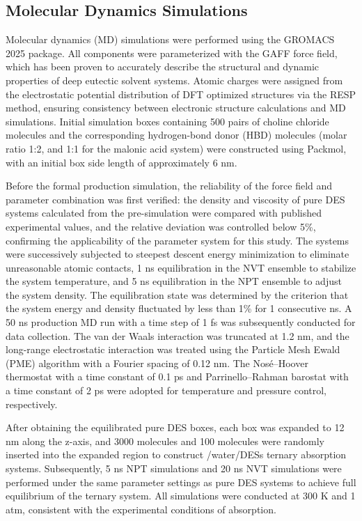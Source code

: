 \documentclass[AMA,LATO2COL]{WileyNJDv5} %
\begin{document}
\subsection{Molecular Dynamics Simulations}
Molecular dynamics (MD) simulations were performed using the GROMACS 2025 package. All components were parameterized with the GAFF force field, which has been proven to accurately describe the structural and dynamic properties of deep eutectic solvent systems. Atomic charges were assigned from the electrostatic potential distribution of DFT optimized structures via the RESP method, ensuring consistency between electronic structure calculations and MD simulations. Initial simulation boxes containing 500 pairs of choline chloride molecules and the corresponding hydrogen-bond donor (HBD) molecules (molar ratio 1:2, and 1:1 for the malonic acid system) were constructed using Packmol, with an initial box side length of approximately 6 nm.

Before the formal production simulation, the reliability of the force field and parameter combination was first verified: the density and viscosity of pure DES systems calculated from the pre-simulation were compared with published experimental values, and the relative deviation was controlled below 5\%, confirming the applicability of the parameter system for this study. The systems were successively subjected to steepest descent energy minimization to eliminate unreasonable atomic contacts, 1 ns equilibration in the NVT ensemble to stabilize the system temperature, and 5 ns equilibration in the NPT ensemble to adjust the system density. The equilibration state was determined by the criterion that the system energy and density fluctuated by less than 1\% for 1 consecutive ns. A 50 ns production MD run with a time step of 1 fs was subsequently conducted for data collection. The van der Waals interaction was truncated at 1.2 nm, and the long-range electrostatic interaction was treated using the Particle Mesh Ewald (PME) algorithm with a Fourier spacing of 0.12 nm. The Nosé–Hoover thermostat with a time constant of 0.1 ps and Parrinello–Rahman barostat with a time constant of 2 ps were adopted for temperature and pressure control, respectively.

After obtaining the equilibrated pure DES boxes, each box was expanded to 12 nm along the z-axis, and 3000  molecules and 100  molecules were randomly inserted into the expanded region to construct /water/DESs ternary absorption systems. Subsequently, 5 ns NPT simulations and 20 ns NVT simulations were performed under the same parameter settings as pure DES systems to achieve full equilibrium of the ternary system. All simulations were conducted at 300 K and 1 atm, consistent with the experimental conditions of  absorption.
\end{document}
